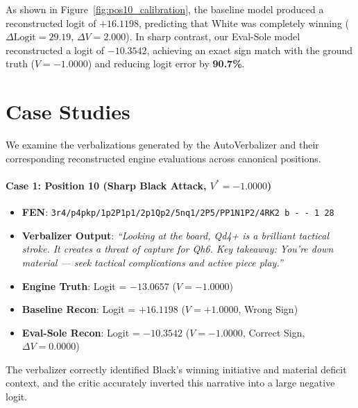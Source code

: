 \documentclass[10pt,twocolumn]{article}
\begin{document}
As shown in Figure~\ref{fig:pos10_calibration}, the baseline model produced a reconstructed logit of $+16.1198$, predicting that White was completely winning ($\Delta \text{Logit} = 29.19$, $\Delta V = 2.000$). In sharp contrast, our Eval-Sole model reconstructed a logit of \textbf{$-10.3542$}, achieving an exact sign match with the ground truth ($V = -1.0000$) and reducing logit error by \textbf{90.7\%}.

\section{Case Studies}
We examine the verbalizations generated by the AutoVerbalizer and their corresponding reconstructed engine evaluations across canonical positions.

\paragraph{Case 1: Position 10 (Sharp Black Attack, $V^* = -1.0000$)}
\begin{itemize}
    \item \textbf{FEN}: \texttt{3r4/p4pkp/1p2P1p1/2p1Qp2/5nq1/2P5/PP1N1P2/4RK2 b - - 1 28}
    \item \textbf{Verbalizer Output}: \textit{``Looking at the board, Qd4+ is a brilliant tactical stroke. It creates a threat of capture for Qh6. Key takeaway: You're down material --- seek tactical complications and active piece play.''}
    \item \textbf{Engine Truth}: Logit = $-13.0657$ ($V = -1.0000$)
    \item \textbf{Baseline Recon}: Logit = $+16.1198$ ($V = +1.0000$, Wrong Sign)
    \item \textbf{Eval-Sole Recon}: Logit = $\mathbf{-10.3542}$ ($V = \mathbf{-1.0000}$, Correct Sign, $\Delta V = 0.0000$)
\end{itemize}
The verbalizer correctly identified Black's winning initiative and material deficit context, and the critic accurately inverted this narrative into a large negative logit.
\end{document}

